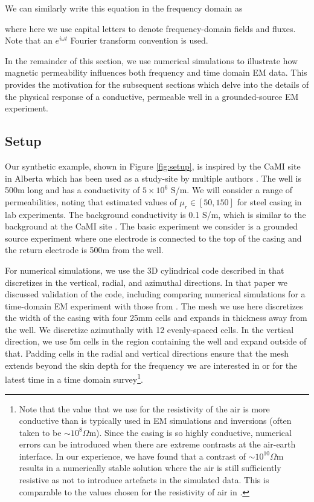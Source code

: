 \documentclass[onecolumn, extra, mreferee]{gji}
\begin{document}
We can similarly write this equation in the frequency domain as

where here we use capital letters to denote frequency-domain fields and fluxes. Note that an $e^{i\omega t}$ Fourier transform convention is used.

In the remainder of this section, we use numerical simulations to illustrate how magnetic permeability influences both frequency and time domain EM data. This provides the motivation for the subsequent sections which delve into the details of the physical response of a conductive, permeable well in a grounded-source EM experiment.
\subsection{Setup}

Our synthetic example, shown in Figure \ref{fig:setup}, is inspired by the CaMI site in Alberta which has been used as a study-site by multiple authors \citep{wilt_casing_2020, beskardes_effects_2021}. The well is 500m long and has a conductivity of $5\times10^6$ S/m. We will consider a range of permeabilities, noting that \citep{Wu1994} estimated values of $\mu_r \in [50, 150]$ for steel casing in lab experiments. The background conductivity is 0.1 S/m, which is similar to the background at the CaMI site \citep{um_joint_2020, lawton_development_2019}. The basic experiment we consider is a grounded source experiment where one electrode is connected to the top of the casing and the return electrode is 500m from the well.



For numerical simulations, we use the 3D cylindrical code described in \citep{heagy_modeling_2019} that discretizes in the vertical, radial, and azimuthal directions. In that paper we discussed validation of the code, including comparing numerical simulations for a time-domain EM experiment with those from \cite{commer_transient-electromagnetic_2015, Haber2007}. The mesh we use here discretizes the width of the casing with four 25mm cells and expands in thickness away from the well. We discretize azimuthally with 12 evenly-spaced cells. In the vertical direction, we use 5m cells in the region containing the well and expand outside of that. Padding cells in the radial and vertical directions ensure that the mesh extends beyond the skin depth for the frequency we are interested in or for the latest time in a time domain survey\footnote{Note that the value that we use for the resistivity of the air is more conductive than is typically used in EM simulations and inversions (often taken to be $\sim10^8 \Omega$m). Since the casing is so highly conductive, numerical errors can be introduced when there are extreme contrasts at the air-earth interface. In our experience, we have found that a contrast of $\sim10^{10} \Omega$m results in a numerically stable solution where the air is still sufficiently resistive as not to introduce artefacts in the simulated data. This is comparable to the values chosen for the resistivity of air in \citep{commer_transient-electromagnetic_2015, wilt_casing_2020}.}.
\end{document}

